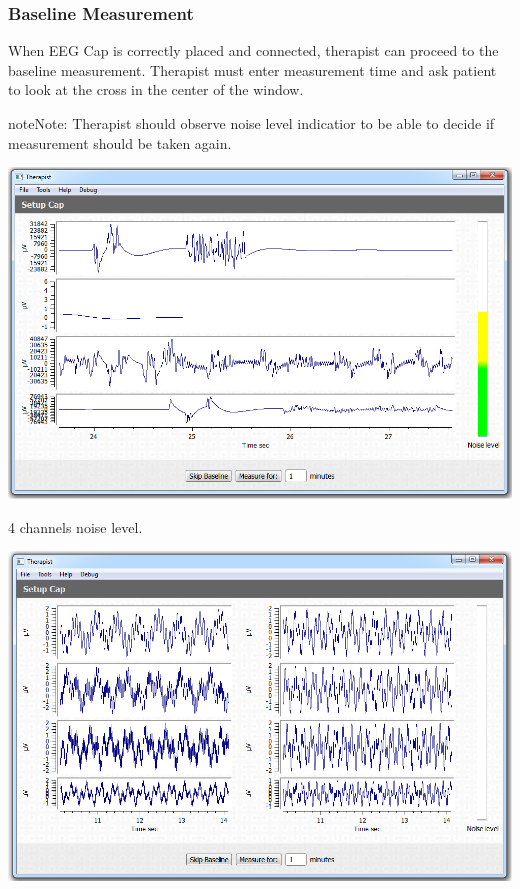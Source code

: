\documentclass[letterpaper,10pt,english]{sphinxmanual}
\begin{document}
\subsubsection{Baseline Measurement}
\label{index:baseline-measurement}
When EEG Cap is correctly placed and connected, therapist can proceed to the baseline measurement. Therapist must enter measurement time and ask patient to look at the cross in the center of the window.

\begin{notice}{note}{Note:}
Therapist should observe noise level indicatior to be able to decide if measurement should be taken again.
\end{notice}

{\hfill\includegraphics{BaseLine.PNG}\hfill}

4 channels noise level.

{\hfill\includegraphics{BaseLine8Ch.PNG}\hfill}
\end{document}
